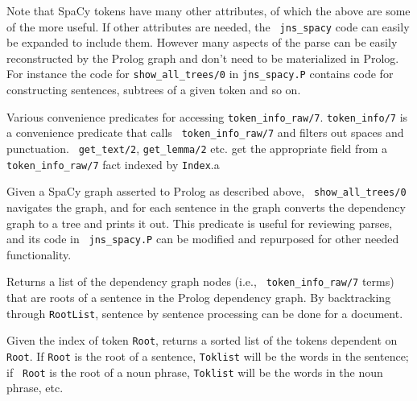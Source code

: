 \begin{description}
Note that SpaCy tokens have many other attributes, of which the above
are some of the more useful.  If other attributes are needed, the {\tt
  jns\_spacy} code can easily be expanded to include them.  However
many aspects of the parse can be easily reconstructed by the Prolog
graph and don't need to be materialized in Prolog.  For instance the
code for {\tt show\_all\_trees/0} in {\tt jns\_spacy.P} contains code
for constructing sentences, subtrees of a given token and so on.

%
Various convenience predicates for accessing {\tt token\_info\_raw/7}.
{\tt token\_info/7} is a convenience predicate that calls {\tt
  token\_info\_raw/7} and filters out spaces and punctuation.  {\tt
  get\_text/2}, {\tt get\_lemma/2} etc. get the appropriate field from
a {\tt token\_info\_raw/7} fact indexed by {\tt Index}.a
  
%
  Given a SpaCy graph asserted to Prolog as described above, {\tt
    show\_all\_trees/0} navigates the graph, and for each sentence in
  the graph converts the dependency graph to a tree and prints it out.
  This predicate is useful for reviewing parses, and its code in {\tt
    jns\_spacy.P} can be modified and repurposed for other needed
  functionality.

%
Returns a list of the dependency graph nodes (i.e., {\tt
  token\_info\_raw/7} terms) that are roots of a sentence in the
Prolog dependency graph.  By backtracking through {\tt RootList},
sentence by sentence processing can be done for a document.

%
Given the index of token {\tt Root}, returns a sorted list of the
tokens dependent on {\tt Root}.  If {\tt Root} is the root of a
sentence, {\tt Toklist} will be the words in the sentence; if {\tt
  Root} is the root of a noun phrase, {\tt Toklist} will be the words
in the noun phrase, etc.

\end{description}  

